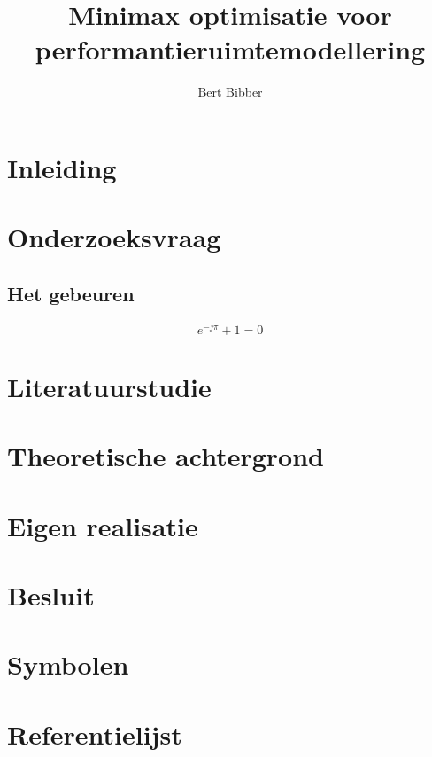 \documentclass[a4paper,11pt,twoside,openright,english]{uantwerpenmasterthesis}
\title{Minimax optimisatie voor performantieruimtemodellering}
\author{Bert Bibber}
\begin{document}
\maketitle

\frontmatter

\tableofcontents

\mainmatter
\chapter*{Inleiding}

\lipsum[1]

\chapter{Onderzoeksvraag}

\section{Het gebeuren}

\lipsum[2]

\begin{equation}
  e^{-j\pi} + 1 = 0
\end{equation}

\lipsum[3]

\chapter{Literatuurstudie}

\chapter{Theoretische achtergrond}

\chapter{Eigen realisatie}

\chapter{Besluit}

\appendix

\chapter{Symbolen}
\chapter{Referentielijst}

\makefinalpage
\end{document}

